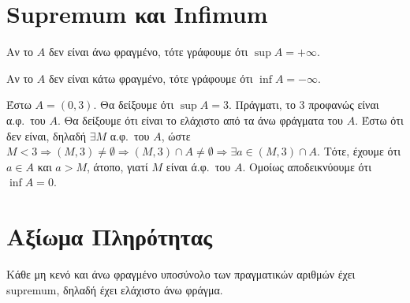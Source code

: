 \documentclass[main.tex]{subfiles}
\begin{document}
\section{Supremum και Infimum}



\begin{rem}
\item {}
  \begin{myitemize}
    \item Αν το $A$ δεν είναι άνω φραγμένο, τότε γράφουμε ότι $ \sup A = 
      + \infty $.
    \item Αν το $A$ δεν είναι κάτω φραγμένο, τότε γράφουμε ότι $ \inf A = 
      - \infty $.
  \end{myitemize}
\end{rem}

\begin{example}
  Έστω $ A = (0,3) $. Θα δείξουμε ότι $ \sup A = 3 $. Πράγματι, 
  το $ 3 $ προφανώς είναι α.φ.\ του $A$. Θα δείξουμε ότι είναι το
  ελάχιστο από τα άνω φράγματα του $A$. Έστω ότι δεν είναι, δηλαδή 
  $ \exists M $ α.φ.\ του $A$, ώστε $ M < 3 \Rightarrow (M,3) \neq 
  \emptyset \Rightarrow (M,3) \cap A \neq \emptyset \Rightarrow \exists 
  a \in (M,3) \cap A $. Τότε, έχουμε ότι $ a \in A $ και $ a > M $, 
  άτοπο, γιατί $M$ είναι ά.φ.\ του $A$. Ομοίως αποδεικνύουμε ότι $ 
  \inf A = 0$.
\end{example}

\section{Αξίωμα Πληρότητας}

Κάθε μη κενό και άνω φραγμένο υποσύνολο των πραγματικών αριθμών έχει 
supremum, δηλαδή έχει ελάχιστο άνω φράγμα.

\end{document}
